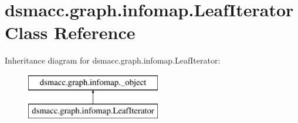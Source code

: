 \hypertarget{classdsmacc_1_1graph_1_1infomap_1_1LeafIterator}{}\section{dsmacc.\+graph.\+infomap.\+Leaf\+Iterator Class Reference}
\label{classdsmacc_1_1graph_1_1infomap_1_1LeafIterator}
Inheritance diagram for dsmacc.\+graph.\+infomap.\+Leaf\+Iterator\+:\begin{figure}[H]
\begin{center}
\leavevmode
\includegraphics[height=2.000000cm]{classdsmacc_1_1graph_1_1infomap_1_1LeafIterator}
\end{center}
\end{figure}
